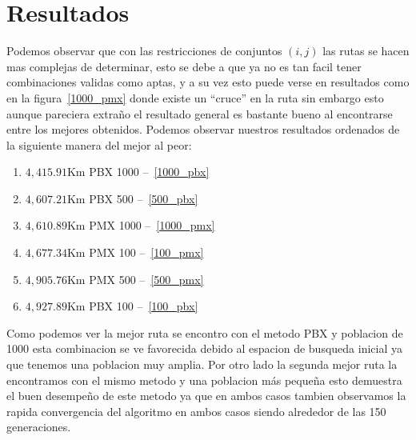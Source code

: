 \section{Resultados}
Podemos observar que con las restricciones de conjuntos $(i,j)$ las rutas se hacen mas complejas de determinar, esto se debe a que ya no
es tan facil tener combinaciones validas como aptas, y a su vez esto puede verse en resultados como en la figura~\ref{1000_pmx} donde existe
un ``cruce'' en la ruta sin embargo esto aunque pareciera extraño el resultado general es bastante bueno al encontrarse entre los mejores 
obtenidos. Podemos observar nuestros resultados ordenados de la siguiente manera del mejor al peor:

\begin{enumerate}
    \item $4,415.91$Km PBX 1000 --~\ref{1000_pbx}
    \item $4,607.21$Km PBX 500 --~\ref{500_pbx}
    \item $4,610.89$Km PMX 1000 --~\ref{1000_pmx}
    \item $4,677.34$Km PMX 100 --~\ref{100_pmx}
    \item $4,905.76$Km PMX 500 --~\ref{500_pmx}
    \item $4,927.89$Km PBX 100 --~\ref{100_pbx}
\end{enumerate}

Como podemos ver la mejor ruta se encontro con el metodo PBX y poblacion de 1000 esta combinacion se ve favorecida debido al espacion de busqueda inicial 
ya que tenemos una poblacion muy amplia. Por otro lado la segunda mejor ruta la encontramos con el mismo metodo y una poblacion más pequeña esto demuestra
el buen desempeño de este metodo ya que en ambos casos tambien observamos la rapida convergencia del algoritmo en ambos casos siendo alrededor de las 150
generaciones.